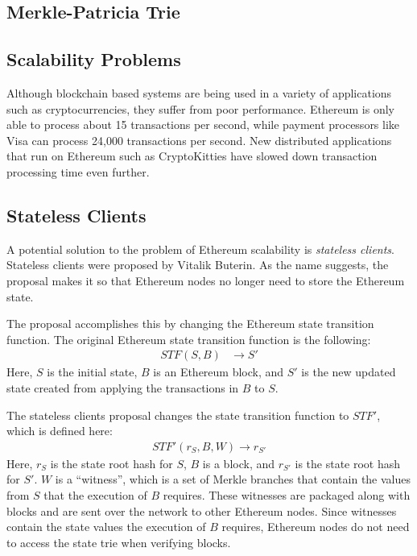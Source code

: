 \documentclass[12pt]{article}
\begin{document}
\subsection{Merkle-Patricia Trie}


\subsection{Scalability Problems}

Although blockchain based systems are being used in a variety of applications such as cryptocurrencies, they suffer from poor performance. Ethereum is only able to process about 15 transactions per second, while payment processors like Visa can process 24,000 transactions per second. New distributed applications that run on Ethereum such as CryptoKitties have slowed down transaction processing time even further.


\subsection{Stateless Clients}

A potential solution to the problem of Ethereum scalability is \emph{stateless clients}. Stateless clients were proposed by Vitalik Buterin. As the name suggests, the proposal makes it so that Ethereum nodes no longer need to store the Ethereum state.

The proposal accomplishes this by changing the Ethereum state transition function. The original Ethereum state transition function is the following:
\begin{align*}
  STF(S, B) &\to S'
\end{align*}
Here, $S$ is the initial state, $B$ is an Ethereum block, and $S'$ is the new updated state created from applying the transactions in $B$ to $S$.

The stateless clients proposal changes the state transition function to $STF'$, which is defined here:
\begin{align*}
  STF'(r_S, B, W) \to r_{S'}
\end{align*}
Here, $r_S$ is the state root hash for $S$, $B$ is a block, and $r_{S'}$ is the state root hash for $S'$. $W$ is a ``witness'', which is a set of Merkle branches that contain the values from $S$ that the execution of $B$ requires. These witnesses are packaged along with blocks and are sent over the network to other Ethereum nodes. Since witnesses contain the state values the execution of $B$ requires, Ethereum nodes do not need to access the state trie when verifying blocks.
\end{document}

